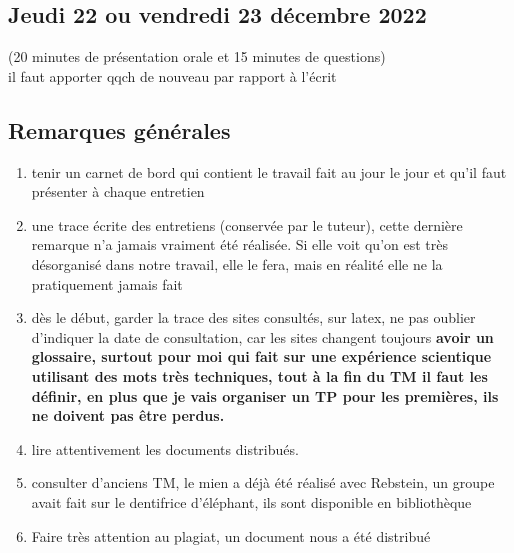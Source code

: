 \documentclass[../main.tex]{subfiles}
\begin{document}
\subsection{Jeudi 22 ou vendredi 23 décembre 2022}
(20 minutes de présentation orale et 15 minutes de questions)\\
il faut apporter qqch de nouveau par rapport à l'écrit \\
\subsection{Remarques générales}
\begin{enumerate}
    \item tenir un carnet de bord qui contient le travail fait au jour le jour et qu'il faut présenter à chaque entretien
    \item une trace écrite des entretiens (conservée par le tuteur), cette dernière remarque n'a jamais vraiment été réalisée. Si elle voit qu'on est très désorganisé dans notre travail, elle le fera, mais en réalité elle ne la pratiquement jamais fait
    \item dès le début, garder la trace des sites consultés, sur latex, ne pas oublier d'indiquer la date de consultation, car les sites changent toujours \textbf{avoir un glossaire, surtout pour moi qui fait sur une expérience scientique utilisant des mots très techniques, tout à la fin du TM il faut les définir, en plus que je vais organiser un TP pour les premières, ils ne doivent pas être perdus.}
    \item lire attentivement les documents distribués.
    \item consulter d'anciens TM, le mien a déjà été réalisé avec Rebstein, un groupe avait fait sur le dentifrice d'éléphant, ils sont disponible en bibliothèque
    \item Faire très attention au plagiat, un document nous a été distribué\\
    
\end{enumerate}
\end{document}
